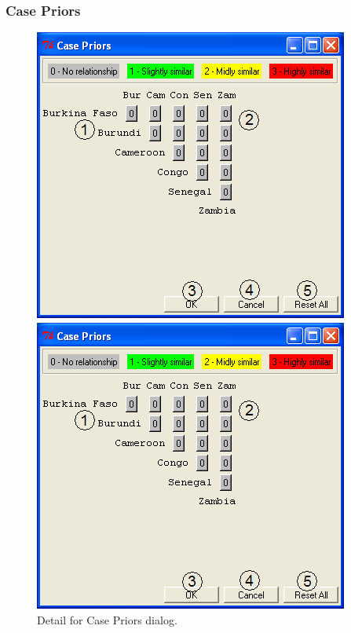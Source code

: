 \documentclass[12pt,titlepage]{article}
\begin{document}
\subsubsection{Case Priors}\label{sec:refcasepri}

\begin{figure}[ht]
  \centering
 \begin{htmlonly} 
   \includegraphics[scale=1]{case} 
 \end{htmlonly}
 \begin{latexonly}
   \includegraphics[scale=.75]{case}
 \end{latexonly}
\caption{Detail for Case Priors dialog.}
\end{figure}
\end{document}
